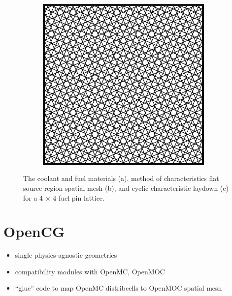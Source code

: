 \begin{figure}[ht!]
\begin{subfigure}[htb!]{0.32\textwidth}
    \label{fig:moc-model-fsrs}
    \caption{}
  \end{subfigure}
  \begin{subfigure}[htb!]{0.32\textwidth}
    \centering
    \includegraphics[width=0.95\textwidth]{figures/workflow/openmoc/cyclic-tracks}
    \label{fig:moc-model-tracks}
    \caption{}
  \end{subfigure}
\caption{The coolant and fuel materials (a), method of characteristics flat source region spatial mesh (b), and cyclic characteristic laydown (c) for a 4 $\times$ 4 fuel pin lattice.}
\label{fig:moc-model}
\end{figure}


\section{OpenCG}
\label{sec:chap3-opencg}

\begin{itemize}[noitemsep]
  \item single physics-agnostic geometries~\cite{boyd2015opencg}
  \item compatibility modules with OpenMC, OpenMOC
  \item ``glue'' code to map OpenMC distribcells to OpenMOC spatial mesh
\end{itemize}

